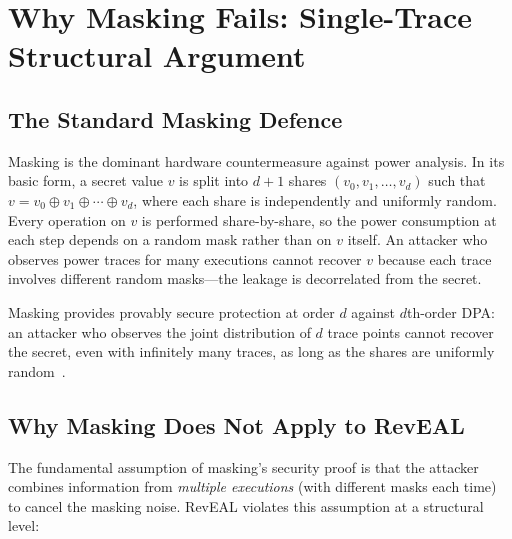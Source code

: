 \documentclass[sigconf,nonacm]{acmart}
\begin{document}
\section{Why Masking Fails: Single-Trace Structural Argument}
\label{sec:masking}

\subsection{The Standard Masking Defence}

Masking is the dominant hardware countermeasure against power analysis. In its basic
form, a secret value $v$ is split into $d+1$ shares $(v_0, v_1, \ldots, v_d)$ such
that $v = v_0 \oplus v_1 \oplus \cdots \oplus v_d$, where each share is
independently and uniformly random. Every operation on $v$ is performed share-by-share,
so the power consumption at each step depends on a random mask rather than on $v$
itself. An attacker who observes power traces for many executions cannot recover $v$
because each trace involves different random masks---the leakage is decorrelated from
the secret.

Masking provides provably secure protection at order $d$ against $d$th-order DPA:
an attacker who observes the joint distribution of $d$ trace points cannot recover
the secret, even with infinitely many traces, as long as the shares are
uniformly random~\cite{ishai2003}.

\subsection{Why Masking Does Not Apply to RevEAL}

The fundamental assumption of masking's security proof is that the attacker combines
information from \emph{multiple executions} (with different masks each time) to
cancel the masking noise. RevEAL violates this assumption at a structural level:
\end{document}
